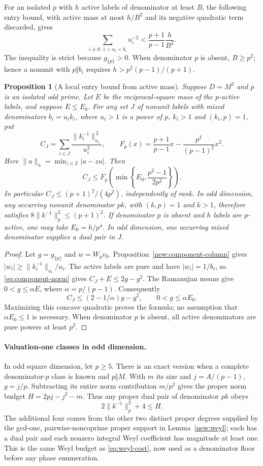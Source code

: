 \documentclass[11pt]{amsart}
\numberwithin{equation}{section}
\newtheorem{proposition}[theorem]{Proposition}
\theoremstyle{definition}
\theoremstyle{plain}
\begin{document}
For an isolated $p$ with $h$ active labels of denominator at least
$B$, the following entry bound, with active mass at most $h/B^2$
and its negative quadratic term discarded, gives
\begin{equation}\label{eq:cost-large-valuation}
 \sum_{i\ne0:\,1<u_i<b_i}u_i^{-2}
 <\frac{p+1}{p-1}\frac h{B^2}.
\end{equation}
The inequality is strict because $g_{\{p\}}>0$.
When denominator $p$ is absent, $B\ge p^2$; hence a nonunit
with $p\Vert b_i$ requires $h>p^2(p-1)/(p+1)$.

\begin{proposition}[A local entry bound from active mass]
\label{new:local-entry-mass}
Suppose $D=M^2$ and $p$ is an isolated odd prime. Let $E$ be the
reciprocal-square mass of the $p$-active labels, and suppose
$E\le E_0$. For any set $J$ of nonunit labels with mixed denominators
$b_i=u_i k_i$, where $u_i>1$ is a power of $p$, $k_i>1$ and $(k_i,p)=1$,
put
\[
 C_J=\sum_{i\in J}\frac{\|k_i^{-1}\|_{u_i}^{\,2}}{u_i^2},
 \qquad
 F_p(x)=\frac{p+1}{p-1}x-\frac{p^2}{(p-1)^2}x^2.
\]
Here $\|a\|_u=\min_{z\in\mathbb Z}|a-zu|$.
Then
\[
 C_J\le
 F_p\!\left(\min\left\{E_0,\frac{p^2-1}{2p^2}\right\}\right).
\]
In particular $C_J\le(p+1)^2/(4p^2)$, independently of rank.
In odd dimension, any occurring nonunit denominator $pk$, with
$(k,p)=1$ and $k>1$, therefore satisfies
$8\|k^{-1}\|_p^2\le(p+1)^2$.
If denominator $p$ is absent and $h$ labels are $p$-active, one
may take $E_0=h/p^4$. In odd dimension, one occurring mixed
denominator supplies a dual pair in $J$.
\end{proposition}
\begin{proof}
Let $g=g_{\{p\}}$ and $w=W_pv_0$. Proposition~\ref{new:component-column}
gives $|w_i|\ge\|k_i^{-1}\|_{u_i}/u_i$. The active labels are
pure and have $|w_i|=1/b_i$, so \eqref{eq:component-norm} gives
$C_J+E\le2g-g^2$. The Ramanujan means give
$0<g\le\alpha E$, where $\alpha=p/(p-1)$.
Consequently
\[
 C_J\le(2-1/\alpha)g-g^2,
 \qquad0<g\le\alpha E_0.
\]
Maximizing this concave quadratic proves the formula; no assumption
that $\alpha E_0\le1$ is necessary. When denominator $p$ is absent,
all active denominators are pure powers at least $p^2$.
\end{proof}

\paragraph{Valuation-one classes in odd dimension.}
In odd square dimension, let $p\ge5$. There is an exact version
when a complete denominator-$p$ class is
known and $p\Vert M$. With $m$ its size and $j=A/(p-1)$,
$g=j/p$. Subtracting its entire norm contribution $m/p^2$ gives
the proper norm budget $H=2pj-j^2-m$. Thus any proper dual pair
of denominator $pk$ obeys
\[
                 2\|k^{-1}\|_p^2+4\le H.
\]
The additional four comes from the other two distinct proper
degrees supplied by the gcd-one, pairwise-noncoprime proper
support in Lemma~\ref{new:weyl}; each has a dual pair and each
nonzero integral Weyl coefficient has magnitude at least one.
This is the same Weyl budget as \eqref{eq:weyl-cost}, now used
as a denominator floor before any phase enumeration.
\end{document}
